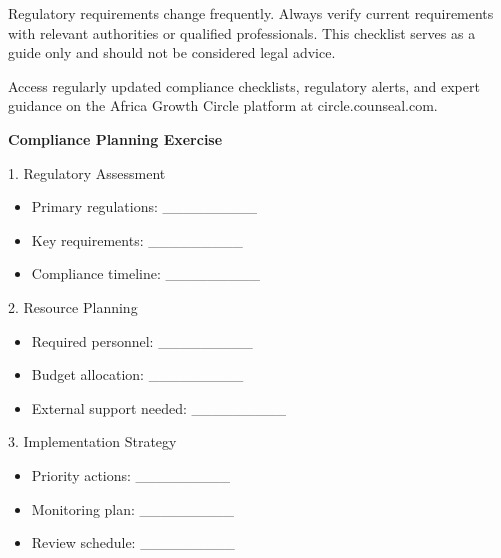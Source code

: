 \vspace{2em}

\begin{warningbox}
    Regulatory requirements change frequently. Always verify current requirements with relevant authorities or qualified professionals. This checklist serves as a guide only and should not be considered legal advice.
\end{warningbox}

\vspace{1em}

\begin{communitybox}
    Access regularly updated compliance checklists, regulatory alerts, and expert guidance on the Africa Growth Circle platform at circle.counseal.com.
\end{communitybox}

\vspace{1em}

\begin{workshopbox}
    \textbf{Compliance Planning Exercise}

    1. Regulatory Assessment
    \begin{itemize}[leftmargin=*]
        \item Primary regulations: \_\_\_\_\_\_\_\_\_
        \item Key requirements: \_\_\_\_\_\_\_\_\_
        \item Compliance timeline: \_\_\_\_\_\_\_\_\_
    \end{itemize}

    2. Resource Planning
    \begin{itemize}[leftmargin=*]
        \item Required personnel: \_\_\_\_\_\_\_\_\_
        \item Budget allocation: \_\_\_\_\_\_\_\_\_
        \item External support needed: \_\_\_\_\_\_\_\_\_
    \end{itemize}

    3. Implementation Strategy
    \begin{itemize}[leftmargin=*]
        \item Priority actions: \_\_\_\_\_\_\_\_\_
        \item Monitoring plan: \_\_\_\_\_\_\_\_\_
        \item Review schedule: \_\_\_\_\_\_\_\_\_
    \end{itemize}
\end{workshopbox}

